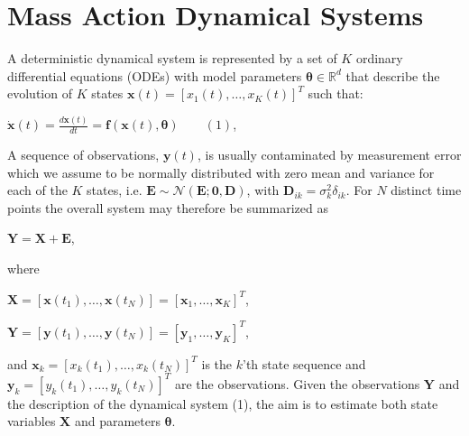     

\section{Mass Action Dynamical Systems}

\begin{par}
A deterministic dynamical system is represented by a set of $K$ ordinary differential equations (ODEs) with model parameters $\boldsymbol\theta \in \mathbb{R}^d$ that describe the evolution of $K$ states $\mathbf{x}(t) = [x_1(t),\ldots, x_K(t)]^T$ such that:
\end{par} \vspace{1em}
\begin{par}
$\dot{\mathbf{x}}(t) = \frac{d \mathbf{x}(t)}{d t} = \mathbf{f}(\mathbf{x}(t),\boldsymbol\theta) \qquad (1)$,
\end{par} \vspace{1em}
\begin{par}
A sequence of observations, $\mathbf{y}(t)$, is usually contaminated by measurement error which we assume to be normally distributed with zero mean and variance for each of the $K$ states, i.e. $\mathbf{E}\sim\mathcal{N}(\mathbf{E};\mathbf{0},\mathbf{D})$, with $\mathbf{D}_{ik}=\sigma_k ^2 \delta_{ik}$. For $N$ distinct time points the overall system may therefore be summarized as
\end{par} \vspace{1em}
\begin{par}
$\mathbf{Y} = \mathbf{X} + \mathbf{E}$,
\end{par} \vspace{1em}
\begin{par}
where
\end{par} \vspace{1em}
\begin{par}
$\mathbf{X} = [\mathbf{x}(t_1),\ldots,\mathbf{x}(t_N)] =  [\mathbf{x}_1,\ldots,\mathbf{x}_K]^T$,
\end{par} \vspace{1em}
\begin{par}
$\mathbf{Y} = [\mathbf{y}(t_1),\ldots,\mathbf{y}(t_N)] =  [\mathbf{y}_1,\ldots,\mathbf{y}_K]^T$,
\end{par} \vspace{1em}
\begin{par}
and $\mathbf{x}_k = [x_k(t_1),\ldots,x_k(t_N)]^T$ is the $k$'th state sequence and $\mathbf{y}_k = [y_k(t_1),\ldots,y_k(t_N)]^T$ are the observations. Given the observations $\mathbf{Y}$ and the description of the dynamical system (1), the aim is to estimate both state variables $\mathbf{X}$ and parameters $\boldsymbol\theta$.
\end{par} \vspace{1em}
